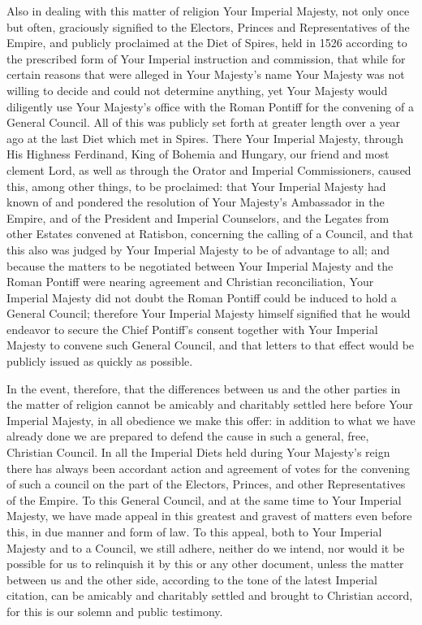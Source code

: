 Also in dealing with this matter of religion Your Imperial Majesty, not only once but often, graciously signified to the Electors, Princes and Representatives of the Empire, and publicly proclaimed at the Diet of Spires, held in 1526 according to the prescribed form of Your Imperial instruction and commission, that while for certain reasons that were alleged in Your Majesty’s name Your Majesty was not willing to decide and could not determine anything, yet Your Majesty would diligently use Your Majesty’s office with the Roman Pontiff for the convening of a General Council. All of this was publicly set forth at greater length over a year ago at the last Diet which met in Spires. There Your Imperial Majesty, through His Highness Ferdinand, King of Bohemia and Hungary, our friend and most clement Lord, as well as through the Orator and Imperial Commissioners, caused this, among other things, to be proclaimed: that Your Imperial Majesty had known of and pondered the resolution of Your Majesty’s Ambassador in the Empire, and of the President and Imperial Counselors, and the Legates from other Estates convened at Ratisbon, concerning the calling of a Council, and that this also was judged by Your Imperial Majesty to be of advantage to all; and because the matters to be negotiated between Your Imperial Majesty and the Roman Pontiff were nearing agreement and Christian reconciliation, Your Imperial Majesty did not doubt the Roman Pontiff could be induced to hold a General Council; therefore Your Imperial Majesty himself signified that he would endeavor to secure the Chief Pontiff’s consent together with Your Imperial Majesty to convene such General Council, and that letters to that effect would be publicly issued as quickly as possible.

In the event, therefore, that the differences between us and the other parties in the matter of religion cannot be amicably and charitably settled here before Your Imperial Majesty, in all obedience we make this offer: in addition to what we have already done we are prepared to defend the cause in such a general, free, Christian Council. In all the Imperial Diets held during Your Majesty’s reign there has always been accordant action and agreement of votes for the convening of such a council on the part of the Electors, Princes, and other Representatives of the Empire. To this General Council, and at the same time to Your Imperial Majesty, we have made appeal in this greatest and gravest of matters even before this, in due manner and form of law. To this appeal, both to Your Imperial Majesty and to a Council, we still adhere, neither do we intend, nor would it be possible for us to relinquish it by this or any other document, unless the matter between us and the other side, according to the tone of the latest Imperial citation, can be amicably and charitably settled and brought to Christian accord, for this is our solemn and public testimony.

